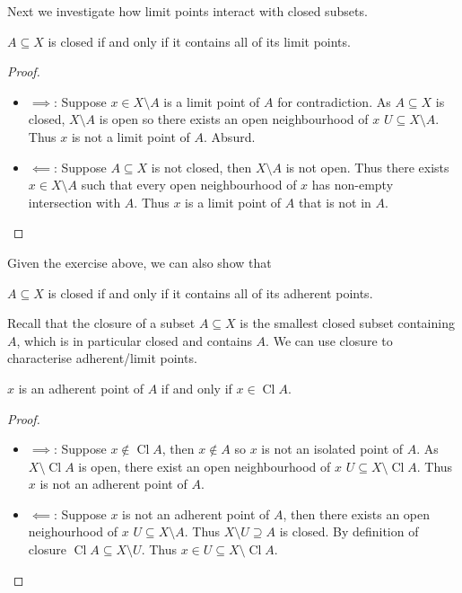 \documentclass[a4paper]{article}
\DeclareMathOperator{\Cl}{Cl}
\begin{document}
Next we investigate how limit points interact with closed subsets.

\begin{proposition}
  \(A \subseteq X\) is closed if and only if it contains all of its limit points.
\end{proposition}

\begin{proof}\leavevmode
  \begin{itemize}
  \item \(\implies\): Suppose \(x \in X \setminus A\) is a limit point of \(A\) for contradiction. As \(A \subseteq X\) is closed, \(X \setminus A\) is open so there exists an open neighbourhood of \(x\) \(U \subseteq X \setminus A\). Thus \(x\) is not a limit point of \(A\). Absurd.
  \item \(\impliedby\): Suppose \(A \subseteq X\) is not closed, then \(X \setminus A\) is not open. Thus there exists \(x \in X \setminus A\) such that every open neighbourhood of \(x\) has non-empty intersection with \(A\). Thus \(x\) is a limit point of \(A\) that is not in \(A\).
  \end{itemize}
\end{proof}

Given the exercise above, we can also show that

\begin{corollary}
  \(A \subseteq X\) is closed if and only if it contains all of its adherent points.
\end{corollary}

Recall that the closure of a subset \(A \subseteq X\) is the smallest closed subset containing \(A\), which is in particular closed and contains \(A\). We can use closure to characterise adherent/limit points.

\begin{proposition}
  \(x\) is an adherent point of \(A\) if and only if \(x \in \Cl A\).
\end{proposition}

\begin{proof}\leavevmode
  \begin{itemize}
  \item \(\implies\): Suppose \(x \notin \Cl A\), then \(x \notin A\) so \(x\) is not an isolated point of \(A\). As \(X \setminus \Cl A\) is open, there exist an open neighbourhood of \(x\) \(U \subseteq X \setminus \Cl A\). Thus \(x\) is not an adherent point of \(A\).
  \item \(\impliedby\): Suppose \(x\) is not an adherent point of \(A\), then there exists an open neighourhood of \(x\) \(U \subseteq X \setminus A\). Thus \(X \setminus U \supseteq A\) is closed. By definition of closure \(\Cl A \subseteq X \setminus U\). Thus \(x \in U \subseteq X \setminus \Cl A\).
  \end{itemize}
\end{proof}
\end{document}
